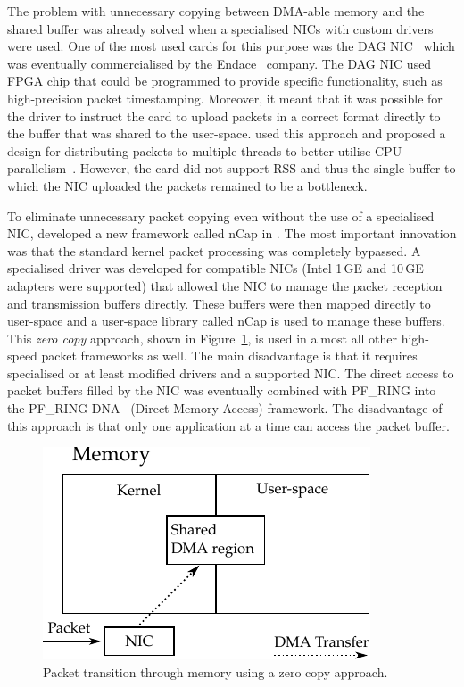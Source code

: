 The problem with unnecessary copying between DMA-able memory and the shared buffer was already solved when a specialised NICs with custom drivers were used. One of the most used cards for this purpose was the DAG NIC~\cite{UniversityWaikato--Dag} which was eventually commercialised by the Endace~\cite{ETL--Endace} company. The DAG NIC used FPGA chip that could be programmed to provide specific functionality, such as high-precision packet timestamping. Moreover, it meant that it was possible for the driver to instruct the card to upload packets in a correct format directly to the buffer that was shared to the user-space. \citeauthor{Degioanni-2004-Introducing} used this approach and proposed a design for distributing packets to multiple threads to better utilise CPU parallelism~\cite{Degioanni-2004-Introducing}. However, the card did not support RSS and thus the single buffer to which the NIC uploaded the packets remained to be a bottleneck.

To eliminate unnecessary packet copying even without the use of a specialised NIC, \citeauthor{Deri-2005-nCap} developed a new framework called nCap in \citeyear{Deri-2005-nCap}. The most important innovation was that the standard kernel packet processing was completely bypassed. A specialised driver was developed for compatible NICs (Intel 1\,GE and 10\,GE adapters were supported) that allowed the NIC to manage the packet reception and transmission buffers directly. These buffers were then mapped directly to user-space and a user-space library called nCap is used to manage these buffers. This \emph{zero copy} approach, shown in Figure~\ref{fig:zero_copy}, is used in almost all other high-speed packet frameworks as well. The main disadvantage is that it requires specialised or at least modified drivers and a supported NIC. The direct access to packet buffers filled by the NIC was eventually combined with PF\_RING into the PF\_RING DNA~\cite{ntop-2010-PFRING} (Direct Memory Access) framework. The disadvantage of this approach is that only one application at a time can access the packet buffer.

\begin{figure}[!tb]
  \begin{center}
    \includegraphics{figures/c05/zero_copy}
  \end{center}
  \caption{Packet transition through memory using a zero copy approach.}
  \label{fig:zero_copy}
\end{figure}

